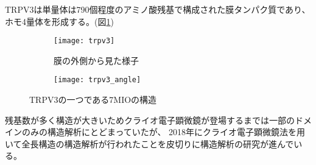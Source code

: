 TRPV3は単量体は790個程度のアミノ酸残基で構成された膜タンパク質であり、ホモ4量体を形成する。(図\ref{fig:trpv3})

\begin{figure}
  \centering
  \begin{subfigure}{0.4\textwidth}
    \texttt{[image: trpv3]}
    \caption{膜の外側から見た様子}
    \label{fig:trpv3}
  \end{subfigure}
  \begin{subfigure}{0.4\textwidth}
    \texttt{[image: trpv3\_angle]}
    \label{fig:trpv3_angle}
  \end{subfigure}
  \caption{TRPV3の一つである7MIOの構造}
  \label{fig:trpv3_structures}
\end{figure}

残基数が多く構造が大きいためクライオ電子顕微鏡が登場するまでは一部のドメインのみの構造解析にとどまっていたが、
2018年にクライオ電子顕微鏡法を用いて全長構造の構造解析が行われた\autocite{singhStructureGatingMechanism2018,zubcevic_conformational_2018}ことを皮切りに構造解析の研究が進んでいる。

